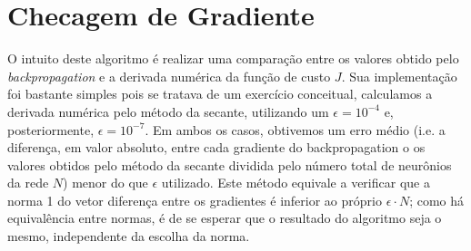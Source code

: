 \section{Checagem de Gradiente}
O intuito deste algoritmo é realizar uma comparação entre os valores obtido pelo \textit{backpropagation} e a derivada numérica da função de custo $J$. Sua implementação foi bastante simples pois se tratava de um exercício conceitual, calculamos a derivada numérica pelo método da secante, utilizando um $\epsilon = 10^{-4}$ e, posteriormente, $\epsilon = 10^{-7}$. Em ambos os casos, obtivemos um erro médio (i.e. a diferença, em valor absoluto, entre cada gradiente do backpropagation o os valores obtidos pelo método da secante dividida pelo número total de neurônios da rede $N$) menor do que $\epsilon$ utilizado. Este método equivale a verificar que a norma 1 do vetor diferença entre os gradientes é inferior ao próprio $\epsilon \cdot N$; como há equivalência entre normas, é de se esperar que o resultado do algoritmo seja o mesmo, independente da escolha da norma.